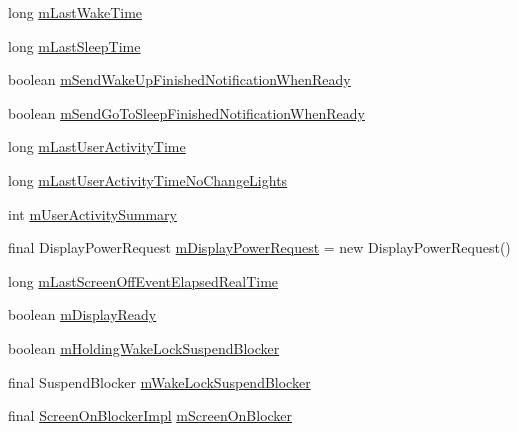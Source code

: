 \begin{DoxyCompactItemize}
\item 
long \hyperlink{classcom_1_1android_1_1server_1_1power_1_1PowerManagerService_a553ec532e50ab8569f506cbdbdec4a11}{m\-Last\-Wake\-Time}
\item 
long \hyperlink{classcom_1_1android_1_1server_1_1power_1_1PowerManagerService_af87d383eef0cde7d4c1ec51c320b4373}{m\-Last\-Sleep\-Time}
\item 
boolean \hyperlink{classcom_1_1android_1_1server_1_1power_1_1PowerManagerService_a64b16e044e7cf8040023c47a43e454d0}{m\-Send\-Wake\-Up\-Finished\-Notification\-When\-Ready}
\item 
boolean \hyperlink{classcom_1_1android_1_1server_1_1power_1_1PowerManagerService_afd18ea0d5356de33f2bc8fb1ce4ce909}{m\-Send\-Go\-To\-Sleep\-Finished\-Notification\-When\-Ready}
\item 
long \hyperlink{classcom_1_1android_1_1server_1_1power_1_1PowerManagerService_ae5fc023b330cd847e64c59a449bb89fd}{m\-Last\-User\-Activity\-Time}
\item 
long \hyperlink{classcom_1_1android_1_1server_1_1power_1_1PowerManagerService_a1b221967b8ecad6c41e7a9c56a540529}{m\-Last\-User\-Activity\-Time\-No\-Change\-Lights}
\item 
int \hyperlink{classcom_1_1android_1_1server_1_1power_1_1PowerManagerService_a998a95d99ff6d701e7d32f4396aa9bd5}{m\-User\-Activity\-Summary}
\item 
final Display\-Power\-Request \hyperlink{classcom_1_1android_1_1server_1_1power_1_1PowerManagerService_a5503b4aebb4f1398ec9fbf484458f5a1}{m\-Display\-Power\-Request} = new Display\-Power\-Request()
\item 
long \hyperlink{classcom_1_1android_1_1server_1_1power_1_1PowerManagerService_ac29b3604000b6c9fe239bbacfb227941}{m\-Last\-Screen\-Off\-Event\-Elapsed\-Real\-Time}
\item 
boolean \hyperlink{classcom_1_1android_1_1server_1_1power_1_1PowerManagerService_a673854abb5aae701b4fba5c5b37f7b50}{m\-Display\-Ready}
\item 
boolean \hyperlink{classcom_1_1android_1_1server_1_1power_1_1PowerManagerService_a14dd61533d51e108b9e442e7661f87f9}{m\-Holding\-Wake\-Lock\-Suspend\-Blocker}
\item 
final Suspend\-Blocker \hyperlink{classcom_1_1android_1_1server_1_1power_1_1PowerManagerService_aab5a1ba2a2eb5e46efbac6c17d78bf52}{m\-Wake\-Lock\-Suspend\-Blocker}
\item 
final \hyperlink{classcom_1_1android_1_1server_1_1power_1_1PowerManagerService_1_1ScreenOnBlockerImpl}{Screen\-On\-Blocker\-Impl} \hyperlink{classcom_1_1android_1_1server_1_1power_1_1PowerManagerService_a60ccb2aecc2625acbfeccb656fe87c11}{m\-Screen\-On\-Blocker}

\end{DoxyCompactItemize}
